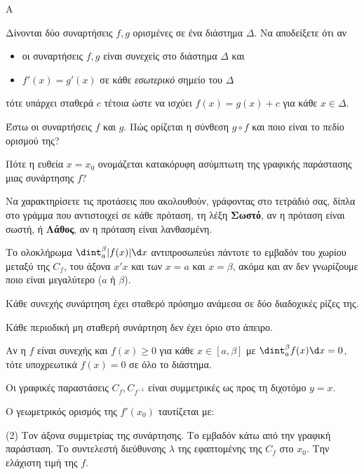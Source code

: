 \begin{thema}{A}
\begin{erwthma}
    \item Δίνονται δύο συναρτήσεις $ f,g $ ορισμένες σε ένα διάστημα $ \varDelta $. Να αποδείξετε ότι αν \begin{itemize} \item οι συναρτήσεις $ f,g $ είναι συνεχείς στο διάστημα $ \varDelta $ και \item $ f'(x)=g'(x) $ σε κάθε \emph{εσωτερικό} σημείο του $ \varDelta $ \end{itemize} τότε υπάρχει σταθερά $ c $ τέτοια ώστε να ισχύει $ f(x)=g(x)+c $ για κάθε $ x\in\varDelta $.
    \item Έστω οι συναρτήσεις $f$ και $g$. Πώς ορίζεται η σύνθεση $g \circ f$ και ποιο είναι το πεδίο ορισμού της?
    \item Πότε η ευθεία $x=x_0$ ονομάζεται κατακόρυφη ασύμπτωτη της γραφικής παράστασης μιας συνάρτησης $f$?
    \item Να χαρακτηρίσετε τις προτάσεις που ακολουθούν, γράφοντας στο τετράδιό σας, δίπλα στο γράμμα που αντιστοιχεί σε κάθε πρόταση, τη λέξη \textbf{Σωστό}, αν η πρόταση είναι σωστή, ή \textbf{Λάθος}, αν η πρόταση είναι λανθασμένη.
    \begin{alist}
        \item Το ολοκλήρωμα $\dint_a^\beta |f(x)| \d x$ αντιπροσωπεύει πάντοτε το εμβαδόν του χωρίου μεταξύ της $C_{f}$, του άξονα $x'x$ και των $x=a$ και $x=\beta$, ακόμα και αν δεν γνωρίζουμε ποιο είναι μεγαλύτερο ($a$ ή $\beta$).
        \item Κάθε συνεχής συνάρτηση έχει σταθερό πρόσημο ανάμεσα σε δύο διαδοχικές ρίζες της.
        \item Κάθε περιοδική μη σταθερή συνάρτηση δεν έχει όριο στο άπειρο.
        \item Αν η $f$ είναι συνεχής και $f(x) \ge 0$ για κάθε $x \in [a, \beta]$ με $\dint_a^\beta f(x) \d x = 0$, τότε υποχρεωτικά $f(x) = 0$ σε όλο το διάστημα.
        \item Οι γραφικές παραστάσεις $C_f, C_{f^{-1}}$ είναι συμμετρικές ως προς τη διχοτόμο $y=x$.
    \end{alist}
    \item Ο γεωμετρικός ορισμός της $f'(x_0)$ ταυτίζεται με:
    \begin{tasks}[label=\let\textdexiakeraia\relax\alph*.](2)
        \task Τον άξονα συμμετρίας της συνάρτησης.
        \task Το εμβαδόν κάτω από την γραφική παράσταση.
        \task Το συντελεστή διεύθυνσης $\lambda$ της εφαπτομένης της $C_f$ στο $x_0$.
        \task Την ελάχιστη τιμή της $f$.
    \end{tasks}
\end{erwthma}
\end{thema}


